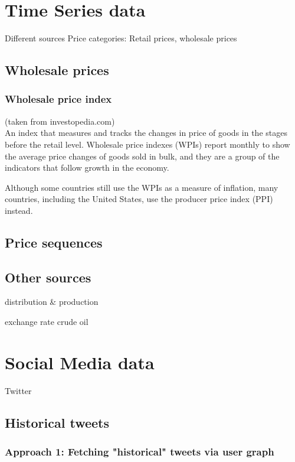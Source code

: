 \section*{Time Series data}
Different sources
Price categories: Retail prices, wholesale prices

\subsection*{Wholesale prices}

\subsubsection*{Wholesale price index}
(taken from investopedia.com)\\
An index that measures and tracks the changes in price of goods in the stages before the retail level. Wholesale price indexes (WPIs) report monthly to show the average price changes of goods sold in bulk, and they are a group of the indicators that follow growth in the economy.\par
Although some countries still use the WPIs as a measure of inflation, many countries, including the United States, use the producer price index (PPI) instead.\par

\subsection*{Price sequences}

\subsection*{Other sources}
distribution \& production

exchange rate
crude oil


\section*{Social Media data}
Twitter

\subsection*{Historical tweets}

\subsubsection*{Approach 1: Fetching "historical" tweets via user graph}

